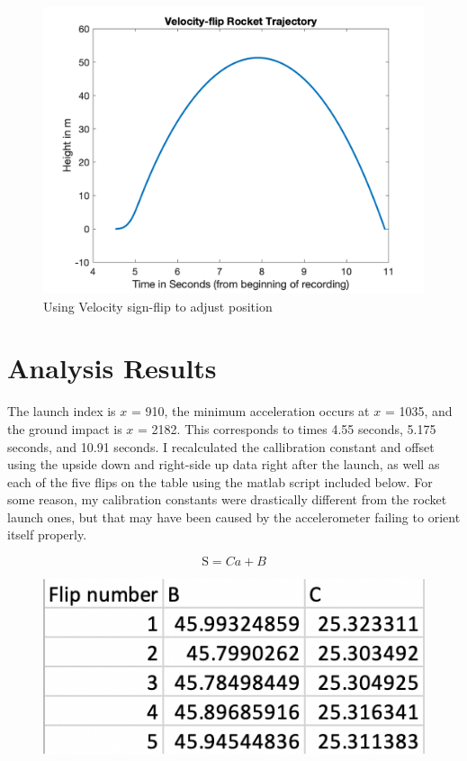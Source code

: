 \documentclass[a4paper,11pt]{article}
\begin{document}
\begin{figure}[H]
\begin{center}
    \includegraphics[width=\linewidth/3]{velrkttraj.png}
\end{center}
    \caption{Using Velocity sign-flip to adjust position}
    \label{fig:Rocket Trajectory}
\end{figure}

\section{Analysis Results}
{The launch index is $x$ = 910, the minimum acceleration occurs at $x$ = 1035, and the ground impact is $x$ = 2182. This corresponds to times 4.55 seconds, 5.175 seconds, and 10.91 seconds.}
{\quad I recalculated the callibration constant and offset using the upside down and right-side up data right after the launch, as well as each of the five flips on the table using the matlab script included below. For some reason, my calibration constants were drastically different from the rocket launch ones, but that may have been caused by the accelerometer failing to orient itself properly.}

\begin{equation} 
\textrm{S} = Ca + B
\end{equation}

\begin{figure}[H]
    \includegraphics[width=\linewidth/4]{table.png}
\end{figure}
\end{document}
